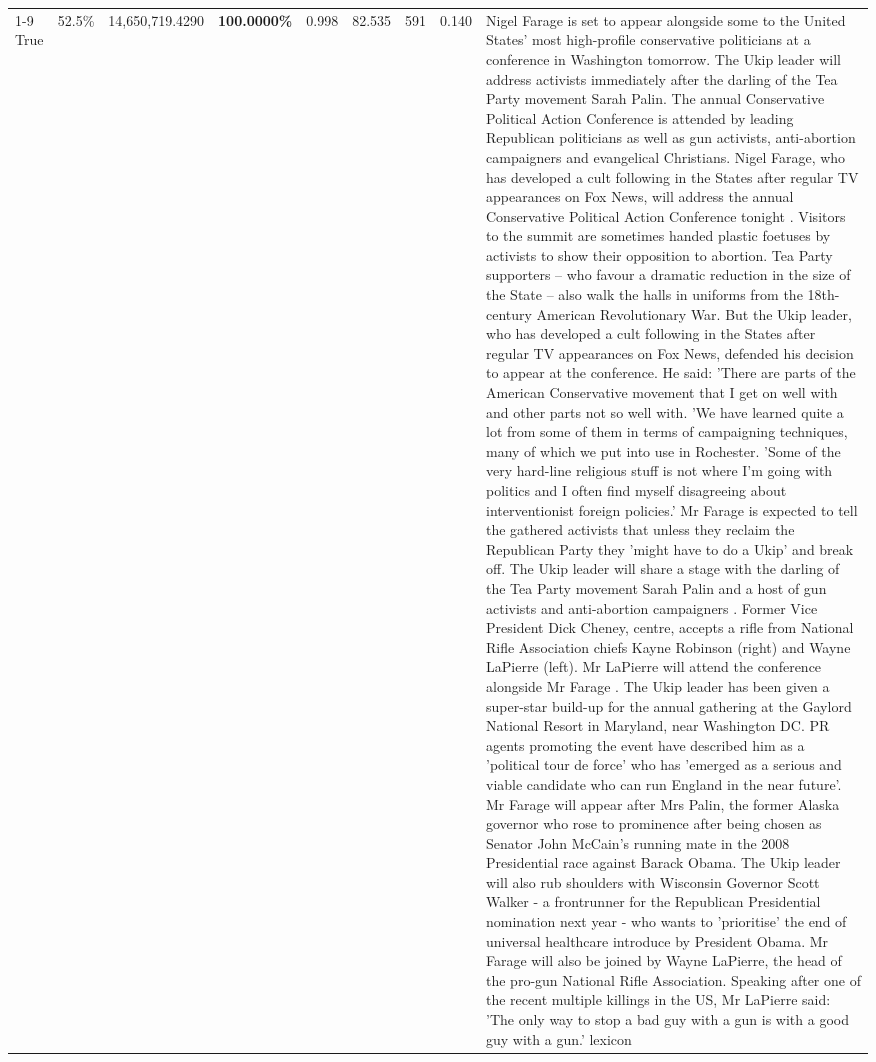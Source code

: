 \begin{table}[H]
\begin{tabular}{lllrlllll}
\cline{1-9} \cline{2-9}
True & 52.5\% & 14,650,719.4290 & \bfseries \color{red} 100.0000\% & 0.998 & 82.535 & 591 & 0.140 & Nigel Farage is set to appear alongside some to the United States' most high-profile conservative politicians at a conference in Washington tomorrow. The Ukip leader will address activists immediately after the darling of the Tea Party movement Sarah Palin. The annual Conservative Political Action Conference is attended by leading Republican politicians as well as gun activists, anti-abortion campaigners and evangelical Christians. Nigel Farage, who has developed a cult following in the States after regular TV appearances on Fox News, will address the annual Conservative Political Action Conference tonight . Visitors to the summit are sometimes handed plastic foetuses by activists to show their opposition to abortion. Tea Party supporters – who favour a dramatic reduction in the size of the State – also walk the halls in uniforms from the 18th-century American Revolutionary War. But the Ukip leader, who has developed a cult following in the States after regular TV appearances on Fox News, defended his decision to appear at the conference. He said: 'There are parts of the American Conservative movement that I get on well with and other parts not so well with. 'We have learned quite a lot from some of them in terms of campaigning techniques, many of which we put into use in Rochester. 'Some of the very hard-line religious stuff is not where I'm going with politics and I often find myself disagreeing about interventionist foreign policies.' Mr Farage is expected to tell the gathered activists that unless they reclaim the Republican Party they 'might have to do a Ukip' and break off. The Ukip leader will share a stage with the darling of the Tea Party movement Sarah Palin and a host of gun activists and anti-abortion campaigners . Former Vice President Dick Cheney, centre, accepts a rifle from National Rifle Association chiefs Kayne Robinson (right) and Wayne LaPierre (left). Mr LaPierre will attend the conference alongside Mr Farage . The Ukip leader has been given a super-star build-up for the annual gathering at the Gaylord National Resort in Maryland, near Washington DC. PR agents promoting the event have described him as a 'political tour de force' who has 'emerged as a serious and viable candidate who can run England in the near future'. Mr Farage will appear after Mrs Palin, the former Alaska governor who rose to prominence after being chosen as Senator John McCain's running mate in the 2008 Presidential race against Barack Obama. The Ukip leader will also rub shoulders with Wisconsin Governor Scott Walker - a frontrunner for the Republican Presidential nomination next year - who wants to 'prioritise' the end of universal healthcare introduce by President Obama. Mr Farage will also be joined by Wayne LaPierre, the head of the pro-gun National Rifle Association. Speaking after one of the recent multiple killings in the US, Mr LaPierre said: 'The only way to stop a bad guy with a gun is with a good guy with a gun.' lexicon \\

\end{tabular}
\end{table}
